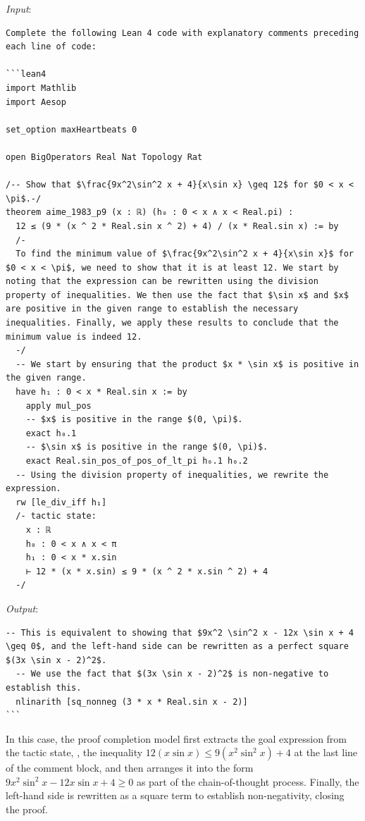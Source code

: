 \noindent \textit{Input}:
\begin{lstlisting}[frame=single]
Complete the following Lean 4 code with explanatory comments preceding each line of code:

```lean4
import Mathlib
import Aesop

set_option maxHeartbeats 0

open BigOperators Real Nat Topology Rat

/-- Show that $\frac{9x^2\sin^2 x + 4}{x\sin x} \geq 12$ for $0 < x < \pi$.-/
theorem aime_1983_p9 (x : ℝ) (h₀ : 0 < x ∧ x < Real.pi) :
  12 ≤ (9 * (x ^ 2 * Real.sin x ^ 2) + 4) / (x * Real.sin x) := by
  /-
  To find the minimum value of $\frac{9x^2\sin^2 x + 4}{x\sin x}$ for $0 < x < \pi$, we need to show that it is at least 12. We start by noting that the expression can be rewritten using the division property of inequalities. We then use the fact that $\sin x$ and $x$ are positive in the given range to establish the necessary inequalities. Finally, we apply these results to conclude that the minimum value is indeed 12.
  -/
  -- We start by ensuring that the product $x * \sin x$ is positive in the given range.
  have h₁ : 0 < x * Real.sin x := by
    apply mul_pos
    -- $x$ is positive in the range $(0, \pi)$.
    exact h₀.1
    -- $\sin x$ is positive in the range $(0, \pi)$.
    exact Real.sin_pos_of_pos_of_lt_pi h₀.1 h₀.2
  -- Using the division property of inequalities, we rewrite the expression.
  rw [le_div_iff h₁]
  /- tactic state:
    x : ℝ
    h₀ : 0 < x ∧ x < π
    h₁ : 0 < x * x.sin
    ⊢ 12 * (x * x.sin) ≤ 9 * (x ^ 2 * x.sin ^ 2) + 4
  -/
\end{lstlisting}
\noindent \textit{Output}:
\begin{lstlisting}[frame=single]
  -- This is equivalent to showing that $9x^2 \sin^2 x - 12x \sin x + 4 \geq 0$, and the left-hand side can be rewritten as a perfect square $(3x \sin x - 2)^2$.
  -- We use the fact that $(3x \sin x - 2)^2$ is non-negative to establish this.
  nlinarith [sq_nonneg (3 * x * Real.sin x - 2)]
```
\end{lstlisting}

In this case, the proof completion model first extracts the goal expression from the tactic state, \ie, the inequality $12(x\sin x)\leq 9(x^2\sin^2 x) + 4$ at the last line of the comment block, and then arranges it into the form $9x^2 \sin^2 x - 12x \sin x + 4 \geq 0$ as part of the chain-of-thought process. Finally, the left-hand side is rewritten as a square term to establish non-negativity, closing the proof.

